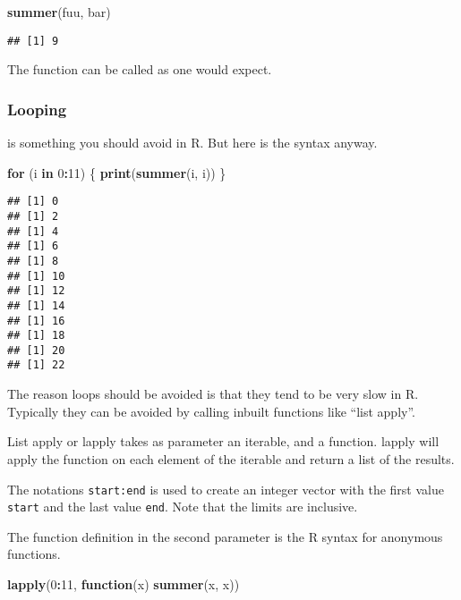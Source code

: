 \documentclass[]{article}
\newenvironment{Shaded}{\begin{snugshade}}{\end{snugshade}}
\newcommand{\KeywordTok}[1]{\textcolor[rgb]{0.13,0.29,0.53}{\textbf{#1}}}
\newcommand{\DecValTok}[1]{\textcolor[rgb]{0.00,0.00,0.81}{#1}}
\newcommand{\ControlFlowTok}[1]{\textcolor[rgb]{0.13,0.29,0.53}{\textbf{#1}}}
\newcommand{\OperatorTok}[1]{\textcolor[rgb]{0.81,0.36,0.00}{\textbf{#1}}}
\newcommand{\NormalTok}[1]{#1}
\begin{document}
\begin{Shaded}
\begin{Highlighting}[]
\KeywordTok{summer}\NormalTok{(fuu, bar)}
\end{Highlighting}
\end{Shaded}

\begin{verbatim}
## [1] 9
\end{verbatim}

The function can be called as one would expect.

\subsubsection{Looping}\label{looping}

is something you should avoid in R. But here is the syntax anyway.

\begin{Shaded}
\begin{Highlighting}[]
\ControlFlowTok{for}\NormalTok{ (i }\ControlFlowTok{in} \DecValTok{0}\OperatorTok{:}\DecValTok{11}\NormalTok{) \{}
  \KeywordTok{print}\NormalTok{(}\KeywordTok{summer}\NormalTok{(i, i))}
\NormalTok{\}}
\end{Highlighting}
\end{Shaded}

\begin{verbatim}
## [1] 0
## [1] 2
## [1] 4
## [1] 6
## [1] 8
## [1] 10
## [1] 12
## [1] 14
## [1] 16
## [1] 18
## [1] 20
## [1] 22
\end{verbatim}

The reason loops should be avoided is that they tend to be very slow in
R. Typically they can be avoided by calling inbuilt functions like
``list apply''.

List apply or lapply takes as parameter an iterable, and a function.
lapply will apply the function on each element of the iterable and
return a list of the results.

The notations \texttt{start:end} is used to create an integer vector
with the first value \texttt{start} and the last value \texttt{end}.
Note that the limits are inclusive.

The function definition in the second parameter is the R syntax for
anonymous functions.

\begin{Shaded}
\begin{Highlighting}[]
\KeywordTok{lapply}\NormalTok{(}\DecValTok{0}\OperatorTok{:}\DecValTok{11}\NormalTok{, }\ControlFlowTok{function}\NormalTok{(x) }\KeywordTok{summer}\NormalTok{(x, x))}
\end{Highlighting}
\end{Shaded}
\end{document}
